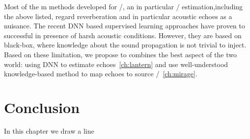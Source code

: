 Most of the m methods developed for \SSL/, an in particular \DOAs/ estimation,including the above listed, regard reverberation and in particular acoustic echoes as a nuisance.
The recent \ac{DNN} based supervised learning approaches have proven to successful in presence of harsh acoustic conditions.
However, they are based on black-box, where knowledge about the sound propagation is not trivial to inject.
Based on these limitation, we propose to combines the best aspect of the two world:
using \ac{DNN} to estimate echoes~\cref{ch:lantern} and use well-understood knowledge-based method to map echoes to source \DOAs/~\cref{ch:mirage}.







\section{Conclusion}\label{sec:application:conclusion}
In this chapter we draw a line


